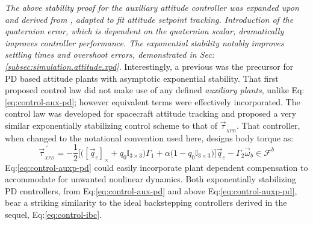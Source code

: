 {\emph{\color{Gray}The above stability proof for the auxiliary attitude controller was expanded upon and derived from \cite{attitudestabilization}, adapted to fit attitude setpoint tracking. Introduction of the quaternion error, which is dependent on the quaternion scalar, dramatically improves controller performance. The exponential stability notably improves settling times and overshoot errors, demonstrated in Sec:\ref{subsec:simulation.attitude.xpd}.}
\newpage
Interestingly, a previous \cite{robustattitude} was the precursor for PD based attitude plants with asymptotic exponential stability. That first proposed control law did not make use of any defined \emph{auxiliary plants}, unlike Eq:\ref{eq:control-aux-pd}; however equivalent terms were effectively incorporated. The control law was developed for spacecraft attitude tracking and proposed a very similar exponentially stabilizing control scheme to that of $\vec{\tau}_{_{XPD}}$. That controller, when changed to the notational convention used here, designs body torque as:
\begin{equation}\label{eq:control-auxp-pd}
\vec{\tau}^{\hspace{3pt}'}_{_{XPD}}=-\frac{1}{2}\Big[\big([\vec{q}_e]_\times+q_0\mathbb{I}_{3\times 3}\big)\Gamma_1+\alpha\big(1-q_0\mathbb{I}_{3\times 3}\big)\Big]\vec{q}_e-\Gamma_2\vec{\omega}_b\in\mathcal{F}^b
\end{equation} 
Eq:\ref{eq:control-auxp-pd} could easily incorporate plant dependent compensation to accommodate for unwanted nonlinear dynamics. Both exponentially stabilizing PD controllers, from Eq:\ref{eq:control-aux-pd} and above Eq:\ref{eq:control-auxp-pd}, bear a striking similarity to the ideal backstepping controllers derived in the sequel, Eq:\ref{eq:control-ibc}. 
}
